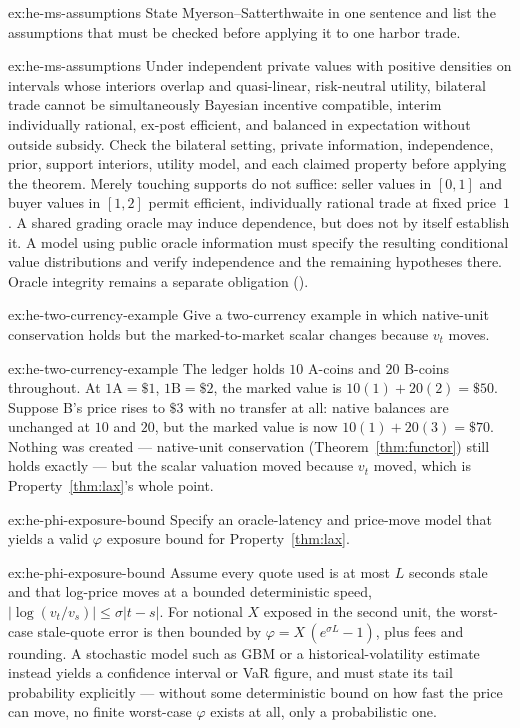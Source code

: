 \documentclass[11pt,a4paper]{article}
\theoremstyle{definition}
\theoremstyle{definition}
\theoremstyle{remark}
\begin{document}
\begin{pdexercise}[kind=Check,rating=1]{ex:he-ms-assumptions}
State Myerson--Satterthwaite in one sentence and list the assumptions that
  must be checked before applying it to one harbor trade.
\end{pdexercise}
\begin{pdsolution}{ex:he-ms-assumptions}
Under independent private values with positive densities on intervals whose
interiors overlap and quasi-linear, risk-neutral utility, bilateral trade cannot
be simultaneously Bayesian incentive compatible, interim individually rational,
ex-post efficient, and balanced in expectation without outside subsidy.
Check the bilateral setting, private information, independence, prior, support
interiors, utility model, and each claimed property before applying the theorem.
Merely touching supports do not suffice: seller values in $[0,1]$ and buyer
values in $[1,2]$ permit efficient, individually rational trade at fixed price~$1$.
A shared grading oracle may induce dependence, but does not by itself establish
it. A model using public oracle information must specify the resulting
conditional value distributions and verify independence and the remaining
hypotheses there. Oracle integrity remains a separate obligation
().
\end{pdsolution}
\begin{pdexercise}[kind=Trace,rating=2]{ex:he-two-currency-example}
Give a two-currency example in which native-unit conservation holds but the
  marked-to-market scalar changes because $v_t$ moves.
\end{pdexercise}
\begin{pdsolution}{ex:he-two-currency-example}
The ledger holds $10$ A-coins and $20$ B-coins throughout. At
$1\text{A}=\$1$, $1\text{B}=\$2$, the marked value is $10(1)+20(2)=\$50$. Suppose
B's price rises to $\$3$ with no transfer at all: native balances are unchanged
at $10$ and $20$, but the marked value is now $10(1)+20(3)=\$70$. Nothing was
created --- native-unit conservation (Theorem~\ref{thm:functor}) still holds
exactly --- but the scalar valuation moved because $v_t$ moved, which is
Property~\ref{thm:lax}'s whole point.
\end{pdsolution}
\begin{pdexercise}[kind=Open,rating=3]{ex:he-phi-exposure-bound}
Specify an oracle-latency and price-move model that yields a valid
  $\varphi$ exposure bound for Property~\ref{thm:lax}.
\end{pdexercise}
\begin{pdsolution}{ex:he-phi-exposure-bound}
Assume every quote used is at most $L$ seconds stale and that log-price
moves at a bounded deterministic speed, $|\log(v_t/v_s)|\le\sigma|t-s|$. For
notional $X$ exposed in the second unit, the worst-case stale-quote error is then
bounded by $\varphi = X\,(e^{\sigma L}-1)$, plus fees and rounding. A stochastic
model such as GBM or a historical-volatility estimate instead yields a
confidence interval or VaR figure, and must state its tail probability
explicitly --- without some deterministic bound on how fast the price can move,
no finite worst-case $\varphi$ exists at all, only a probabilistic one.
\end{pdsolution}
\end{document}
